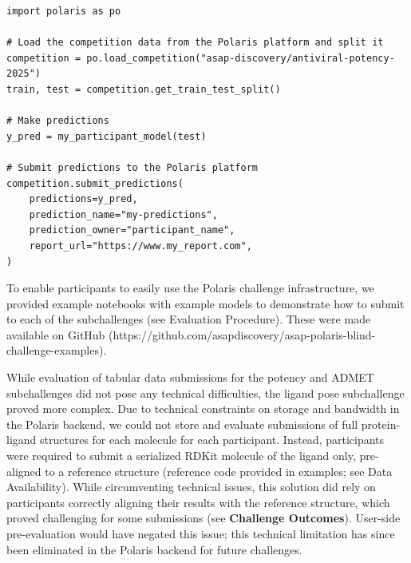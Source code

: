 \documentclass[journal=jcim,manuscript=article]{achemso}
\newenvironment{code}{\captionsetup{type=listing}}{}
\begin{document}
\begin{code}
\label{code:submission}
\begin{verbatim}
import polaris as po

# Load the competition data from the Polaris platform and split it
competition = po.load_competition("asap-discovery/antiviral-potency-2025")
train, test = competition.get_train_test_split()

# Make predictions
y_pred = my_participant_model(test)

# Submit predictions to the Polaris platform
competition.submit_predictions(
    predictions=y_pred,
    prediction_name="my-predictions",
    prediction_owner="participant_name",
    report_url="https://www.my_report.com",
)
\end{verbatim}
\end{code}


To enable participants to easily use the Polaris challenge infrastructure, we provided example notebooks with example models to demonstrate how to submit to each of the subchallenges (see Evaluation Procedure). These were made available on GitHub (https://github.com/asapdiscovery/asap-polaris-blind-challenge-examples). 

While evaluation of tabular data submissions for the potency and ADMET subchallenges did not pose any technical difficulties, the ligand pose subchallenge proved more complex. Due to technical constraints on storage and bandwidth in the Polaris backend, we could not store and evaluate submissions of full protein-ligand structures for each molecule for each participant. Instead, participants were required to submit a serialized RDKit molecule of the ligand only, pre-aligned to a reference structure (reference code provided in examples; see Data Availability). While circumventing technical issues, this solution did rely on participants correctly aligning their results with the reference structure, which proved challenging for some submissions (see \textbf{Challenge Outcomes}). User-side pre-evaluation would have negated this issue; this technical limitation has since been eliminated in the Polaris backend for future challenges.
\end{document}
